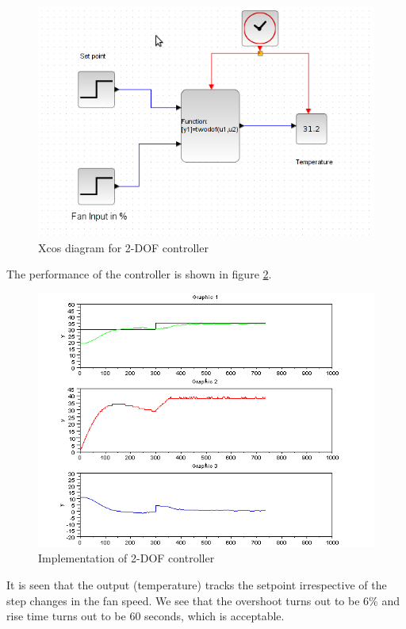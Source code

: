 \begin{figure}
\centering
\includegraphics[width=\linewidth]{2-DOF_manual/2dof-xcos}
\caption{Xcos diagram for 2-DOF controller}
\label{2dof-xcos}
\end{figure}
The performance of the controller is shown in figure \ref{rt_127}. 
\begin{figure}
\centering
\includegraphics[width=\linewidth]{2-DOF_manual/2dof_resp.png}
\caption{Implementation of 2-DOF controller}
\label{rt_127}
\end{figure}
It is seen that the output (temperature) tracks the setpoint irrespective of the step changes in the fan speed.
We see that the overshoot turns out to be 6\% and rise time turns out to be 60 seconds, which is acceptable.

